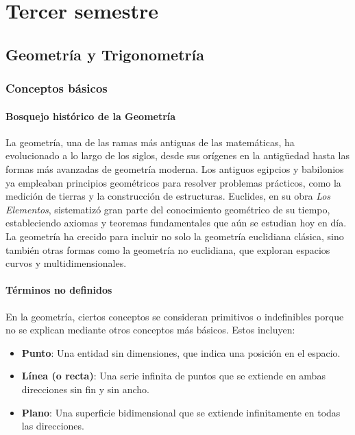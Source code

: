 \part{Tercer semestre}
\chapter{Geometría y Trigonometría} %


\section{Conceptos básicos}

\subsection{Bosquejo histórico de la Geometría}
La geometría, una de las ramas más antiguas de las matemáticas, ha evolucionado a lo largo de los siglos, desde sus orígenes en la antigüedad hasta las formas más avanzadas de geometría moderna. Los antiguos egipcios y babilonios ya empleaban principios geométricos para resolver problemas prácticos, como la medición de tierras y la construcción de estructuras. Euclides, en su obra \emph{Los Elementos}, sistematizó gran parte del conocimiento geométrico de su tiempo, estableciendo axiomas y teoremas fundamentales que aún se estudian hoy en día. La geometría ha crecido para incluir no solo la geometría euclidiana clásica, sino también otras formas como la geometría no euclidiana, que exploran espacios curvos y multidimensionales.

\subsection{Términos no definidos}
En la geometría, ciertos conceptos se consideran primitivos o indefinibles porque no se explican mediante otros conceptos más básicos. Estos incluyen:
\begin{itemize}
    \item \textbf{Punto}: Una entidad sin dimensiones, que indica una posición en el espacio.
    \item \textbf{Línea (o recta)}: Una serie infinita de puntos que se extiende en ambas direcciones sin fin y sin ancho.
    \item \textbf{Plano}: Una superficie bidimensional que se extiende infinitamente en todas las direcciones.
\end{itemize}

